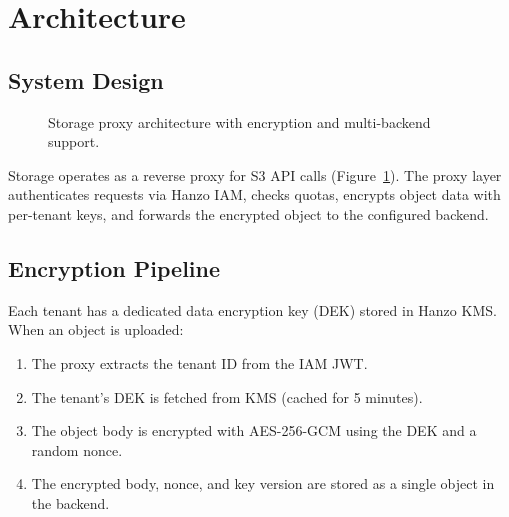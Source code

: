 \documentclass[11pt,twocolumn]{article}
\begin{document}
\section{Architecture}

\subsection{System Design}

\begin{figure}[t]
\centering
{}
\caption{Storage proxy architecture with encryption and multi-backend support.}
\label{fig:storage}
\end{figure}

Storage operates as a reverse proxy for S3 API calls (Figure~\ref{fig:storage}). The proxy layer authenticates requests via Hanzo IAM, checks quotas, encrypts object data with per-tenant keys, and forwards the encrypted object to the configured backend.

\subsection{Encryption Pipeline}

Each tenant has a dedicated data encryption key (DEK) stored in Hanzo KMS. When an object is uploaded:

\begin{enumerate}
    \item The proxy extracts the tenant ID from the IAM JWT.
    \item The tenant's DEK is fetched from KMS (cached for 5 minutes).
    \item The object body is encrypted with AES-256-GCM using the DEK and a random nonce.
    \item The encrypted body, nonce, and key version are stored as a single object in the backend.
\end{enumerate}
\end{document}
